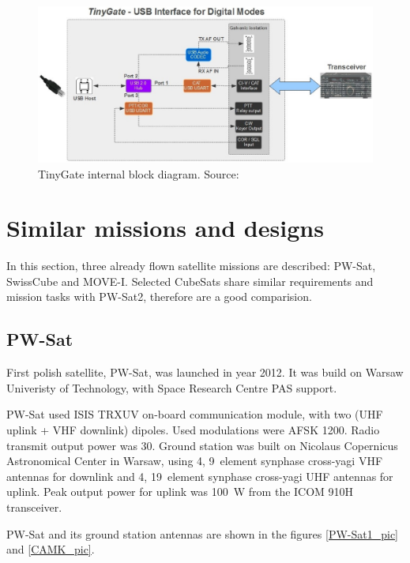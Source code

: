 \begin{figure}[H]
    \centering
    \includegraphics[width=0.7\paperwidth]{img/4/tinygate_schematic.jpg}
    \caption{TinyGate internal block diagram. Source: \cite{tinygate_manual}}
    \label{tnc:tinygate_schema}
\end{figure}

\newpage

\section{Similar missions and designs}
In this section, three already flown satellite missions are described: PW-Sat, SwissCube and MOVE-I. Selected CubeSats share similar requirements and mission tasks with PW-Sat2, therefore are a good comparision.

\subsection{PW-Sat}
First polish satellite, PW-Sat, was launched in year \si{2012}. It was build on Warsaw Univeristy of Technology, with Space Research Centre PAS support. 

PW-Sat used ISIS TRXUV on-board communication module, with two (UHF uplink + VHF downlink) dipoles. Used modulations were AFSK \SI{1200}{\bps}. Radio transmit output power was \SI{30}{\dBm}. 
Ground station was built on Nicolaus Copernicus Astronomical Center in Warsaw, using \si{4}, \si{9}~element synphase cross-yagi VHF antennas for downlink and \si{4}, \si{19}~element synphase cross-yagi UHF antennas for uplink. Peak output power for uplink was \SI{100}{\watt} from the ICOM 910H transceiver.

PW-Sat and its ground station antennas are shown in the figures \ref{PW-Sat1_pic} and \ref{CAMK_pic}.

